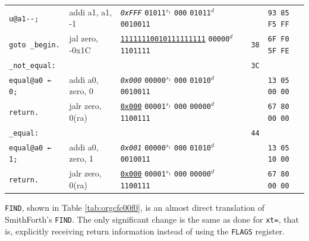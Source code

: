 \documentclass[a4paper,12pt,final]{article}
\begin{document}
\begin{table}[!htbp]
\begin{adjustwidth}{-1cm}{-1cm}
\begin{center}
\begin{tabular}{l|ll|l|l}
\hspace{1.053000em} \texttt{u@a1-{}-{};} & addi a1, a1, -1 & \emph{\texttt{0xFFF}}                    \texttt{01011}​\(^{s_{1}}\) \texttt{000} \texttt{01011}​\(^{d}\)  \texttt{0010011} &  & \texttt{93 85 F5 FF}\\[0pt]
\hspace{1.053000em} \texttt{goto \_begin.} & jal zero, -0x1C & \uline{\texttt{11111110010111111111}}                                     \texttt{00000}​\(^{d}\)  \texttt{1101111} & \texttt{38} & \texttt{6F F0 5F FE}\\[0pt]
\texttt{\_not\_equal:} &  &  & \texttt{3C} & \\[0pt]
\hspace{1.053000em} \texttt{equal@a0 ← 0;} & addi a0, zero, 0 & \emph{\texttt{0x000}}                    \texttt{00000}​\(^{s_{1}}\) \texttt{000} \texttt{01010}​\(^{d}\)  \texttt{0010011} &  & \texttt{13 05 00 00}\\[0pt]
\hspace{1.053000em} \texttt{return.} & jalr zero, 0(ra) & \uline{\texttt{0x000}}                    \texttt{00001}​\(^{s_{1}}\) \texttt{000} \texttt{00000}​\(^{d}\)  \texttt{1100111} &  & \texttt{67 80 00 00}\\[0pt]
\texttt{\_equal:} &  &  & \texttt{44} & \\[0pt]
\hspace{1.053000em} \texttt{equal@a0 ← 1;} & addi a0, zero, 1 & \emph{\texttt{0x001}}                    \texttt{00000}​\(^{s_{1}}\) \texttt{000} \texttt{01010}​\(^{d}\)  \texttt{0010011} &  & \texttt{13 05 10 00}\\[0pt]
\hspace{1.053000em} \texttt{return.} & jalr zero, 0(ra) & \uline{\texttt{0x000}}                    \texttt{00001}​\(^{s_{1}}\) \texttt{000} \texttt{00000}​\(^{d}\)  \texttt{1100111} &  & \texttt{67 80 00 00}\\[0pt]
\end{tabular}

\end{center}
\normalsize \end{adjustwidth} \end{table} \vspace{0}

\texttt{FIND}, shown in Table \ref{tab:orgcfc00f0}, is an almost direct
translation of SmithForth's \texttt{FIND}.  The only significant change is
the same as done for \texttt{xt=}, that is, explicitly receiving return
information instead of using the \texttt{FLAGS} register.
\end{document}
